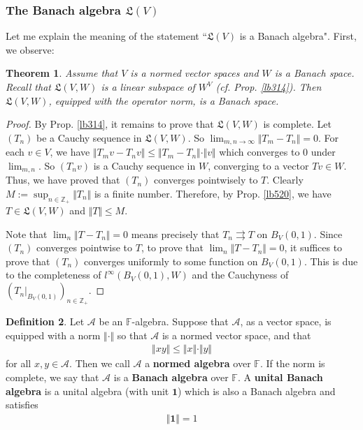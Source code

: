 \documentclass[12pt,b5paper,notitlepage]{article}
\theoremstyle{definition}
\newtheorem{df}{Definition}[section]
\theoremstyle{plain}
\newtheorem{thm}[df]{Theorem}
\newcommand{\fk}{\mathfrak}
\newcommand{\idt}{\mathbf{1}}
\newcommand{\scr}{\mathscr}
\newcommand{\Zbb}{\mathbb Z}
\newcommand{\Fbb}{\mathbb F}
\numberwithin{equation}{section}
\begin{document}
\subsubsection{The Banach algebra $\fk L(V)$}


Let me explain the meaning of the statement ``$\fk L(V)$ is a Banach algebra". First, we observe:


\begin{thm}\label{lb540}
Assume that $V$ is a normed vector spaces and $W$ is a Banach space. Recall that $\fk L(V,W)$ is a linear subspace of $W^V$ (cf. Prop. \ref{lb314}). Then $\fk L(V,W)$, equipped with the operator norm, is a Banach space.
\end{thm}


\begin{proof}
By Prop. \ref{lb314}, it remains to prove that $\fk L(V,W)$ is complete. Let $(T_n)$ be a Cauchy sequence in $\fk L(V,W)$. So $\lim_{m,n\rightarrow\infty}\Vert T_m-T_n\Vert=0$. For each $v\in V$, we have $\Vert T_mv-T_nv\Vert\leq \Vert T_m-T_n\Vert\cdot\Vert v\Vert$ which converges to $0$ under $\lim_{m,n}$. So $(T_nv)$ is a Cauchy sequence in $W$, converging to a vector $Tv\in W$. Thus, we have proved that $(T_n)$ converges pointwisely to $T$. Clearly $M:=\sup_{n\in\Zbb_+}\Vert T_n\Vert$ is a finite number. Therefore, by Prop. \ref{lb520}, we have $T\in\fk L(V,W)$ and $\Vert T\Vert\leq M$. 

Note that $\lim_n\Vert T-T_n\Vert=0$ means precisely that $T_n\rightrightarrows T$ on $B_V(0,1)$. Since $(T_n)$ converges pointwise to $T$, to prove that $\lim_n\Vert T-T_n\Vert=0$, it suffices to prove that $(T_n)$ converges uniformly to some function on $B_V(0,1)$. This is due to the completeness of $l^\infty(B_V(0,1),W)$ and the Cauchyness of $(T_n|_{B_V(0,1)})_{n\in\Zbb_+}$. 
\end{proof}


\begin{df}
Let $\scr A$ be an $\Fbb$-algebra. Suppose that $\scr A$, as a vector space, is equipped with a norm $\Vert\cdot\Vert$ so that $\scr A$ is a normed vector space, and that
\begin{align}
\Vert xy\Vert\leq\Vert x\Vert\cdot\Vert y\Vert \label{eq208}
\end{align}
for all $x,y\in\scr A$. Then we call $\scr A$ a \textbf{normed algebra} over $\Fbb$.  If the norm is complete, we say that $\scr A$ is a \textbf{Banach algebra}  over $\Fbb$. A \textbf{unital Banach algebra}  is a unital algebra (with unit $\idt$) which is also a Banach algebra and satisfies
\begin{align*}
\Vert\idt\Vert=1
\end{align*}
\end{df}
\end{document}
